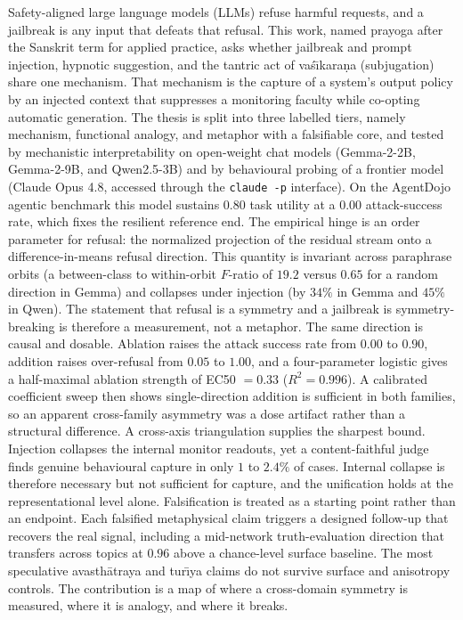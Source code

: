 Safety-aligned large language models (LLMs) refuse harmful requests, and a
jailbreak is any input that defeats that refusal. This work, named prayoga after
the Sanskrit term for applied practice, asks whether jailbreak and prompt
injection, hypnotic suggestion, and the tantric act of vaś\=\i kara\d{n}a
(subjugation) share one mechanism. That mechanism is the capture of a system's
output policy by an injected context that suppresses a monitoring faculty while
co-opting automatic generation. The thesis is split into three labelled
tiers, namely mechanism, functional analogy, and metaphor with a falsifiable
core, and tested by mechanistic interpretability on open-weight chat models
(Gemma-2-2B, Gemma-2-9B, and Qwen2.5-3B) and by behavioural probing of a frontier
model (Claude Opus 4.8, accessed through the \texttt{claude -p} interface). On the
AgentDojo agentic benchmark this model sustains $0.80$ task utility at a $0.00$
attack-success rate, which fixes the resilient reference end. The
empirical hinge is an order parameter for refusal: the normalized projection of
the residual stream onto a difference-in-means refusal direction. This quantity is
invariant across paraphrase orbits (a between-class to within-orbit $F$-ratio of
$19.2$ versus $0.65$ for a random direction in Gemma) and collapses under injection
(by $34\%$ in Gemma and $45\%$ in Qwen). The statement that refusal is a symmetry
and a jailbreak is symmetry-breaking is therefore a measurement, not a metaphor.
The same direction is causal and dosable. Ablation raises the attack success rate
from $0.00$ to $0.90$, addition raises over-refusal from $0.05$ to $1.00$, and a
four-parameter logistic gives a half-maximal ablation strength of EC50 $=0.33$
($R^2=0.996$). A calibrated coefficient sweep then shows single-direction addition
is sufficient in both families, so an apparent cross-family asymmetry was a dose
artifact rather than a structural difference. A cross-axis triangulation supplies
the sharpest bound. Injection collapses the internal monitor readouts, yet a
content-faithful judge finds genuine behavioural capture in only $1$ to $2.4\%$ of
cases. Internal collapse is therefore necessary but not sufficient for capture, and
the unification holds at the representational level alone. Falsification is treated
as a starting point rather than an endpoint. Each falsified metaphysical claim
triggers a designed follow-up that recovers the real signal, including a
mid-network truth-evaluation direction that transfers across topics at $0.96$ above
a chance-level surface baseline. The most speculative avasth\=atraya and tur\=\i ya
claims do not survive surface and anisotropy controls. The contribution is a map of
where a cross-domain symmetry is measured, where it is analogy, and where it breaks.
